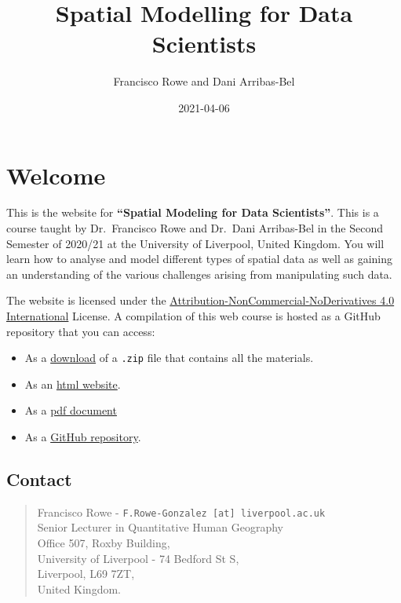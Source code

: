 \documentclass[
]{book}
\title{Spatial Modelling for Data Scientists}
\author{Francisco Rowe and Dani Arribas-Bel}
\date{2021-04-06}
\providecommand{\tightlist}{%
  \setlength{\itemsep}{0pt}\setlength{\parskip}{0pt}}
\begin{document}
\maketitle

{
\setcounter{tocdepth}{1}
\tableofcontents
}
\hypertarget{welcome}{%
\chapter*{Welcome}\label{welcome}}

This is the website for \textbf{``Spatial Modeling for Data Scientists''}. This is a course taught by Dr.~Francisco Rowe and Dr.~Dani Arribas-Bel in the Second Semester of 2020/21 at the University of Liverpool, United Kingdom. You will learn how to analyse and model different types of spatial data as well as gaining an understanding of the various challenges arising from manipulating such data.

The website is licensed under the \href{https://creativecommons.org/licenses/by-nc-nd/4.0/}{Attribution-NonCommercial-NoDerivatives 4.0 International} License. A compilation of this web course is hosted as a GitHub repository that you can access:

\begin{itemize}
\tightlist
\item
  As a \href{https://github.com/GDSL-UL/san/archive/master.zip}{download} of a \texttt{.zip} file that contains all the materials.
\item
  As an \href{https://gdsl-ul.github.io/san/}{html website}.
\item
  As a \href{https://gdsl-ul.github.io/san/spatial_analysis_notes.pdf}{pdf document}
\item
  As a \href{https://github.com/GDSL-UL/san}{GitHub repository}.
\end{itemize}

\hypertarget{contact}{%
\section*{Contact}\label{contact}}

\begin{quote}
Francisco Rowe - \texttt{F.Rowe-Gonzalez\ {[}at{]}\ liverpool.ac.uk}\\
Senior Lecturer in Quantitative Human Geography\\
Office 507, Roxby Building,\\
University of Liverpool - 74 Bedford St S,\\
Liverpool, L69 7ZT,\\
United Kingdom.
\end{quote}
\end{document}
